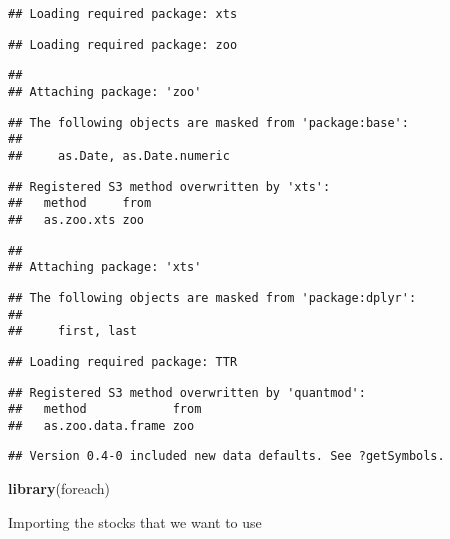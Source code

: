 \documentclass[]{article}
\newenvironment{Shaded}{\begin{snugshade}}{\end{snugshade}}
\newcommand{\KeywordTok}[1]{\textcolor[rgb]{0.13,0.29,0.53}{\textbf{#1}}}
\newcommand{\NormalTok}[1]{#1}
\begin{document}
\begin{verbatim}
## Loading required package: xts
\end{verbatim}

\begin{verbatim}
## Loading required package: zoo
\end{verbatim}

\begin{verbatim}
## 
## Attaching package: 'zoo'
\end{verbatim}

\begin{verbatim}
## The following objects are masked from 'package:base':
## 
##     as.Date, as.Date.numeric
\end{verbatim}

\begin{verbatim}
## Registered S3 method overwritten by 'xts':
##   method     from
##   as.zoo.xts zoo
\end{verbatim}

\begin{verbatim}
## 
## Attaching package: 'xts'
\end{verbatim}

\begin{verbatim}
## The following objects are masked from 'package:dplyr':
## 
##     first, last
\end{verbatim}

\begin{verbatim}
## Loading required package: TTR
\end{verbatim}

\begin{verbatim}
## Registered S3 method overwritten by 'quantmod':
##   method            from
##   as.zoo.data.frame zoo
\end{verbatim}

\begin{verbatim}
## Version 0.4-0 included new data defaults. See ?getSymbols.
\end{verbatim}

\begin{Shaded}
\begin{Highlighting}[]
\KeywordTok{library}\NormalTok{(foreach)}
\end{Highlighting}
\end{Shaded}

Importing the stocks that we want to use
\end{document}
